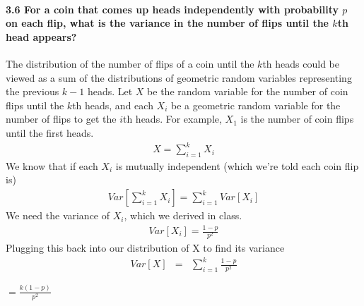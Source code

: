 \documentclass{article}
\begin{document}
\paragraph{3.6 For a coin that comes up heads independently with probability
$p$ on each flip, what is the variance in the number of flips until the $k$th
head appears?\\}
The distribution of the number of flips of a coin until the $k$th heads could
be viewed as a sum of the distributions of geometric random variables 
representing the previous $k-1$ heads. Let $X$ be the random variable for the
number of coin flips until the $k$th heads, and each $X_i$ be a geometric 
random variable for the number of flips to get the $i$th heads. For example,
$X_1$ is the number of coin flips until the first heads. 
\begin{eqnarray*}
X = \sum_{i=1}^k X_i
\end{eqnarray*}
We know that if each $X_i$ is mutually independent (which we're told each coin
flip is)
\begin{eqnarray*}
Var[\sum_{i=1}^k X_i] = \sum_{i=1}^k Var[X_i]
\end{eqnarray*}
We need the variance of $X_i$, which we derived in class.
\begin{eqnarray*}
Var[X_i] = \frac{1-p}{p^2}
\end{eqnarray*}
Plugging this back into our distribution of X to find its variance
\begin{eqnarray*}
Var[X] & = & \sum_{i=1}^k \frac{1-p}{p^2}
\end{eqnarray*}
\begin{center}
$\boxed{=\frac{k(1-p)}{p^2}}$
\end{center}
\end{document}
